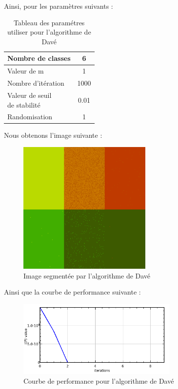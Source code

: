 \documentclass[a4paper,11pt]{article}
\begin{document}
Ainsi, pour les paramètres suivants : 

\begin{table}[H]
  \begin{center}
    \begin{tabular}{|l|c|}
      \hline
      Nombre de classes & 6 \\
      \hline
      Valeur de m & 1 \\
      \hline
      Nombre d'itération & 1000 \\
      \hline
      \shortstack{ Valeur de seuil \\ de stabilité }  & 0.01 \\
      \hline
      Randomisation & 1 \\
      \hline
    \end{tabular}
    \caption{Tableau des paramétres utiliser pour l'algorithme de Davé}
  \end{center}
\end{table}

Nous obtenons l'image suivante :

\begin{figure}[H]
\begin{center}
\includegraphics[width=250px]{../img/Dave.png}
\end{center}
\caption{Image segmentée par l'algorithme de Davé}
\end{figure}

Ainsi que la courbe de performance suivante :

\begin{figure}[H]
\begin{center}
\includegraphics[width=300px]{../img/Perf_Dave.png}
\end{center}
\caption{Courbe de performance pour l'algorithme de Davé}
\end{figure}
\end{document}
